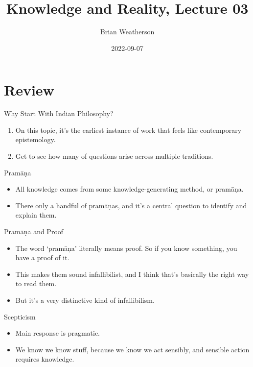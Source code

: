 \documentclass[
  17pt,
  letterpaper,
  ignorenonframetext,
  aspectratio=169,
  handout]{beamer}
\title{Knowledge and Reality, Lecture 03}
\author{Brian Weatherson}
\date{2022-09-07}
\providecommand{\tightlist}{%
  \setlength{\itemsep}{0pt}\setlength{\parskip}{0pt}}\usepackage{longtable,booktabs,array}
\begin{document}
\frame{\titlepage}
\ifdefined\Shaded\renewenvironment{Shaded}{\begin{tcolorbox}[borderline west={3pt}{0pt}{shadecolor}, frame hidden, sharp corners, enhanced, interior hidden, boxrule=0pt, breakable]}{\end{tcolorbox}}\fi

\hypertarget{review}{%
\section{Review}\label{review}}

\begin{frame}{Why Start With Indian Philosophy?}
\protect\hypertarget{why-start-with-indian-philosophy}{}
\begin{enumerate}[<+->]
\tightlist
\item
  On this topic, it's the earliest instance of work that feels like
  contemporary epistemology.
\item
  Get to see how many of questions arise across multiple traditions.
\end{enumerate}
\end{frame}

\begin{frame}{Pramāṇa}
\protect\hypertarget{pramux101ux1e47a}{}
\begin{itemize}[<+->]
\tightlist
\item
  All knowledge comes from some knowledge-generating method, or pramāṇa.
\item
  There only a handful of pramāṇas, and it's a central question to
  identify and explain them.
\end{itemize}
\end{frame}

\begin{frame}{Pramāṇa and Proof}
\protect\hypertarget{pramux101ux1e47a-and-proof}{}
\begin{itemize}[<+->]
\tightlist
\item
  The word `pramāṇa' literally means proof. So if you know something,
  you have a proof of it.
\item
  This makes them sound infallibilist, and I think that's basically the
  right way to read them.
\item
  But it's a very distinctive kind of infallibilism.
\end{itemize}
\end{frame}

\begin{frame}{Scepticism}
\protect\hypertarget{scepticism}{}
\begin{itemize}[<+->]
\tightlist
\item
  Main response is pragmatic.
\item
  We know we know stuff, because we know we act sensibly, and sensible
  action requires knowledge.
\end{itemize}
\end{frame}
\end{document}
